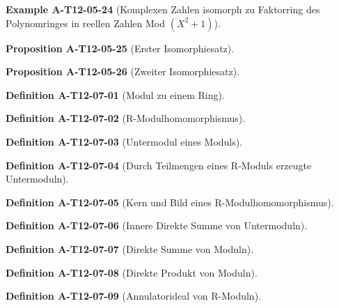 \documentclass[10pt, letterpaper]{article}
\newcommand{\CustomHeading}[3]{%
  \par\medskip\noindent%
  \textbf{#1 #2} \textnormal{(#3)}.\enskip%
}
\newenvironment{DEF}[2]{\CustomHeading{Definition}{#1}{#2}}{}
\newenvironment{PROP}[2]{\CustomHeading{Proposition}{#1}{#2}}{}
\newenvironment{EXA}[2]{\CustomHeading{Example}{#1}{#2}}{}
\begin{document}
\begin{EXA}{A-T12-05-24}{Komplexen Zahlen isomorph zu Faktorring des Polynomringes in reellen Zahlen Mod $(X^2+1)$}
\end{EXA}

\begin{PROP}{A-T12-05-25}{Erster Isomorphiesatz}
\end{PROP}

\begin{PROP}{A-T12-05-26}{Zweiter Isomorphiesatz}
\end{PROP}

\begin{DEF}{A-T12-07-01}{Modul zu einem Ring}
\end{DEF}

\begin{DEF}{A-T12-07-02}{R-Modulhomomorphismus}
\end{DEF}

\begin{DEF}{A-T12-07-03}{Untermodul eines Moduls}
\end{DEF}

\begin{DEF}{A-T12-07-04}{Durch Teilmengen eines R-Moduls erzeugte Untermoduln}
\end{DEF}

\begin{DEF}{A-T12-07-05}{Kern und Bild eines R-Modulhomomorphismus}
\end{DEF}

\begin{DEF}{A-T12-07-06}{Innere Direkte Summe von Untermoduln}
\end{DEF}

\begin{DEF}{A-T12-07-07}{Direkte Summe von Moduln}
\end{DEF}

\begin{DEF}{A-T12-07-08}{Direkte Produkt von Moduln}
\end{DEF}

\begin{DEF}{A-T12-07-09}{Annulatorideal von R-Moduln}
\end{DEF}
\end{document}

